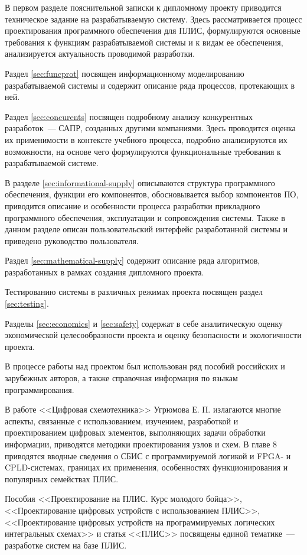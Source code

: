 В первом разделе пояснительной записки к дипломному проекту приводится техническое задание на разрабатываемую систему.
Здесь рассматривается процесс проектирования программного обеспечения для ПЛИС, формулируются основные требования к функциям разрабатываемой системы и к видам ее обеспечения, анализируется актуальность проводимой разработки.

Раздел \ref{sec:funcprot} посвящен информационному моделированию разрабатываемой системы и содержит описание ряда процессов, протекающих в ней.

Раздел \ref{sec:concurents} посвящен подробному анализу конкурентных разработок~--- САПР, созданных другими компаниями. Здесь проводится оценка их применимости в контексте учебного процесса, подробно анализируются их возможности, на основе чего формулируются функциональные требования к разрабатываемой системе.

В разделе \ref{sec:informational-supply} описываются структура программного обеспечения, функции его компонентов, обосновывается выбор компонентов ПО, приводится описание и особенности процесса разработки прикладного программного обеспечения, эксплуатации и сопровождения системы.
Также в данном разделе описан пользовательский интерфейс разработанной системы и приведено руководство пользователя.

Раздел \ref{sec:mathematical-supply} содержит описание ряда алгоритмов, разработанных в рамках создания дипломного проекта.

Тестированию системы в различных режимах проекта посвящен раздел \ref{sec:testing}.

Разделы \ref{sec:economics} и \ref{sec:safety} содержат в себе аналитическую оценку экономической целесообразности проекта и оценку безопасности и экологичности проекта.

В процессе работы над проектом был использован ряд пособий российских и зарубежных авторов, а также справочная информация по языкам программирования.

В работе <<Цифровая схемотехника>> Угрюмова Е. П. излагаются многие аспекты, связанные с использованием, изучением, разработкой и проектированием цифровых элементов, выполняющих задачи обработки информации, приводятся методики проектирования узлов и схем.
В главе 8 приводятся вводные сведения о СБИС с программируемой логикой и FPGA- и CPLD-системах, границах их применения, особенностях функционирования и популярных семействах ПЛИС.

Пособия <<Проектирование на ПЛИС. Курс молодого бойца>>, <<Проектирование цифровых устройств с использованием ПЛИС>>, <<Проектирование цифровых устройств на программируемых логических интегральных схемах>> и статья <<ПЛИС>> посвящены единой тематике~--- разработке систем на базе ПЛИС.

